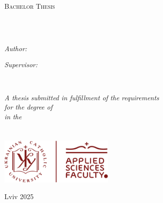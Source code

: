 \documentclass[
11pt, %
oneside, %
ukrainian,
english, %
singlespacing, %
headsepline, %
]{BachelorMasterThesis}
\author{Andrii \textsc{Yaroshevych}}
\begin{document}
\frontmatter
\pagestyle{plain}


\begin{titlepage}
\begin{center}

\vspace*{.06\textheight}
{\scshape\LARGE \univname\par}\vspace{1.5cm}
\textsc{\Large Bachelor Thesis}\\[0.5cm]

\HRule \\[0.4cm]
{\huge \bfseries \ttitle\par}\vspace{0.4cm}
\HRule \\[1.5cm]
 
\begin{minipage}[t]{0.4\textwidth}
\begin{flushleft} \large
\emph{Author:}\\
\href{https://orcid.org/0009-0001-4766-9954}{\authorname}
\end{flushleft}
\end{minipage}
\begin{minipage}[t]{0.4\textwidth}
\begin{flushright} \large
\emph{Supervisor:} \\
\href{https://orcid.org/0000-0002-0762-2377}{\supname}
\end{flushright}
\end{minipage}\\[3cm]

\vfill

\large \textit{A thesis submitted in fulfillment of the requirements\\ for the degree of \degreename}\\[0.3cm] %
\textit{in the}\\[0.4cm]
\facname\\\deptname\\[2cm]
 
\vfill
\includegraphics[height=2.3cm]{UCU_APPS_logo}

\vfill
{\large Lviv 2025}\\[4cm]
 
\vfill
\end{center}
\end{titlepage}
\end{document}
